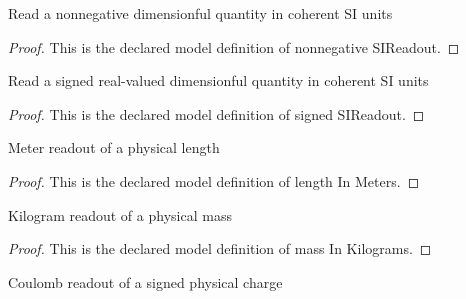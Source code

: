 \begin{definition}
  \label{def:physics:phyx-mini-0634:phyxminiproblems-problemphyxmini0634-nonnegativesireadout}
  Read a nonnegative dimensionful quantity in coherent SI units
\end{definition}
\begin{proof}
  This is the declared model definition of nonnegative SIReadout.
\end{proof}
\begin{definition}
  \label{def:physics:phyx-mini-0634:phyxminiproblems-problemphyxmini0634-signedsireadout}
  Read a signed real-valued dimensionful quantity in coherent SI units
\end{definition}
\begin{proof}
  This is the declared model definition of signed SIReadout.
\end{proof}
\begin{definition}
  \label{def:physics:phyx-mini-0634:phyxminiproblems-problemphyxmini0634-lengthinmeters}
  Meter readout of a physical length
\end{definition}
\begin{proof}
  This is the declared model definition of length In Meters.
\end{proof}
\begin{definition}
  \label{def:physics:phyx-mini-0634:phyxminiproblems-problemphyxmini0634-massinkilograms}
  Kilogram readout of a physical mass
\end{definition}
\begin{proof}
  This is the declared model definition of mass In Kilograms.
\end{proof}
\begin{definition}
  \label{def:physics:phyx-mini-0634:phyxminiproblems-problemphyxmini0634-chargeincoulombs}
  Coulomb readout of a signed physical charge
\end{definition}
